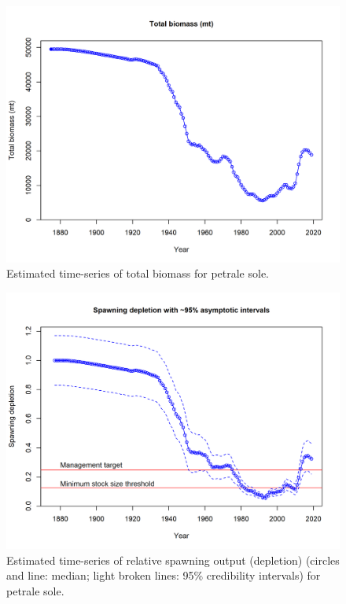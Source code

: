 \documentclass[12pt,]{article}
\begin{document}
\FloatBarrier

\begin{figure}
\centering
\includegraphics{r4ss/plots_mod1/ts1_Total_biomass_(mt).png}
\caption{Estimated time-series of total biomass for petrale sole.
\label{fig:total_bio}}
\end{figure}

\FloatBarrier

\begin{figure}
\centering
\includegraphics{r4ss/plots_mod1/ts9_Spawning_depletion_with_95_asymptotic_intervals_intervals.png}
\caption{Estimated time-series of relative spawning output (depletion)
(circles and line: median; light broken lines: 95\% credibility
intervals) for petrale sole. \label{fig:depl}}
\end{figure}
\end{document}
